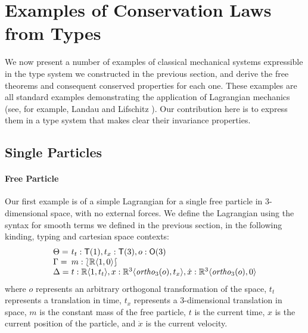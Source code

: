 \documentclass[preprint]{sigplanconf}
\newcommand{\sepbar}{\mathrel|}
\newcommand{\typeOfCartSp}[1]{\lbag #1 \rbag}
\theoremstyle{examplestyle}
\begin{document}
\section{Examples of Conservation Laws from Types}
\label{sec:examples}

We now present a number of examples of classical mechanical systems
expressible in the type system we constructed in the previous section,
and derive the free theorems and consequent conserved properties for
each one. These examples are all standard examples demonstrating the
application of Lagrangian mechanics (see, for example, Landau and
Lifschitz \cite{landau60mechanics}). Our contribution here is to
express them in a type system that makes clear their invariance
properties.

\subsection{Single Particles}


\paragraph{Free Particle}

Our first example is of a simple Lagrangian for a single free particle
in $3$-dimensional space, with no external forces. We define the
Lagrangian using the syntax for smooth terms we defined in the
previous section, in the following kinding, typing and cartesian space
contexts:
\begin{displaymath}
  \begin{array}{l@{\hspace{0.3em}}l}
    \Theta = & t_t : \mathsf{T}(1), t_x : \mathsf{T}(3), o : \mathsf{O}(3) \\
    \Gamma = & m : \typeOfCartSp{\mathbb{R}\langle 1, 0 \rangle} \\
    \Delta = & t : \mathbb{R}\langle 1, t_t \rangle, x : \mathbb{R}^3\langle \mathit{ortho}_3(o), t_x \rangle, \dot{x} : \mathbb{R}^3\langle \mathit{ortho}_3(o), 0 \rangle
  \end{array}
\end{displaymath}
where $o$ represents an arbitrary orthogonal transformation of the
space, $t_t$ represents a translation in time, $t_x$ represents a
$3$-dimensional translation in space, $m$ is the constant mass of the
free particle, $t$ is the current time, $x$ is the current position of
the particle, and $\dot{x}$ is the current velocity.
\end{document}
